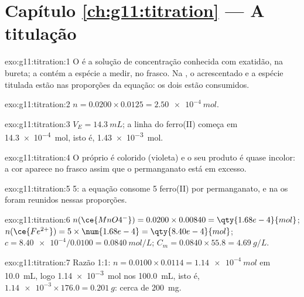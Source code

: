 \section*{Capítulo \ref{ch:g11:titration} --- A titulação}

\begin{solution}{exo:g11:titration:1}
O  é a solução de concentração conhecida com exatidão, na
bureta; a  contém a espécie a medir, no frasco. Na
, o  acrescentado e a espécie titulada estão nas
proporções da equação: os dois estão consumidos.
\end{solution}

\begin{solution}{exo:g11:titration:2}
$n = 0.0200 \times 0.0125 = \qty{2.50e-4}{mol}$.
\end{solution}

\begin{solution}{exo:g11:titration:3}
$V_E = \qty{14.3}{mL}$; a linha do ferro(II) começa em
\qty{14.3e-4}{mol}, isto é, \qty{1.43e-3}{mol}.
\end{solution}

\begin{solution}{exo:g11:titration:4}
O próprio  é colorido (violeta) e o seu produto é quase
incolor: a cor aparece no frasco assim que o permanganato está em
excesso.
\end{solution}

\begin{solution}{exo:g11:titration:5}
5: a equação consome 5  ferro(II) por  permanganato, e na
 os  foram reunidos nessas proporções.
\end{solution}

\begin{solution}{exo:g11:titration:6}
$n(\ce{MnO4^-}) = 0.0200 \times 0.00840 = \qty{1.68e-4}{mol}$;
$n(\ce{Fe^{2+}}) = 5 \times \num{1.68e-4} = \qty{8.40e-4}{mol}$;
$c = \num{8.40e-4} / 0.0100 = \qty{0.0840}{mol/L}$;
$C_m = 0.0840 \times 55.8 = \qty{4.69}{g/L}$.
\end{solution}

\begin{solution}{exo:g11:titration:7}
Razão 1:1: $n = 0.0100 \times 0.0114 = \qty{1.14e-4}{mol}$ em
\qty{10.0}{mL}, logo \qty{1.14e-3}{mol} nos \qty{100.0}{mL}, isto é,
$\num{1.14e-3} \times 176.0 = \qty{0.201}{g}$: cerca de \qty{200}{mg}.
\end{solution}

